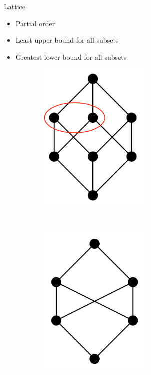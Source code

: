 \begin{frame}{Lattice}
  \begin{itemize}
  \item Partial order 
  \item Least upper bound for all subsets
  \item Greatest lower bound for all subsets
  \end{itemize}


  \begin{figure}
    \begin{subfigure}[b]{0.4\textwidth}
      \includegraphics[width=0.6\textwidth]{graphics/lattice_high}
    \end{subfigure}
    ~
    \begin{subfigure}[b]{0.4\textwidth}
      \includegraphics[width=0.6\textwidth]{graphics/notlattice}
    \end{subfigure}    
  \end{figure}
\end{frame}

